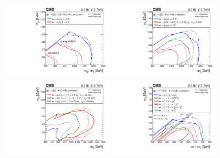 \clearpage
\begin{figure}[thp!]
  \begin{center}
    \includegraphics[width=0.49\textwidth]{figures/limits/v1/mixSUMMARY.pdf}
    \includegraphics[width=0.49\textwidth]{figures/limits/v1/gluinoSUMMARY.pdf} \\
    \includegraphics[width=0.49\textwidth]{figures/limits/v1/naturalSUMMARY.pdf}
    \includegraphics[width=0.49\textwidth]{figures/limits/v1/allThirdGenSUMMARY.pdf} \\

\end{center}
\end{figure}
